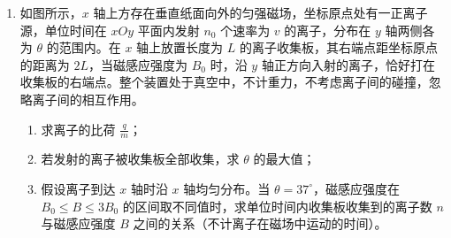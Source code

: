 \documentclass[\gkver]{gaokaozhenti}
\begin{document}
\begin{enumerate}
{\begin{enumerate}
	\item
	$2.3\times10^{-3}\UJ$

\end{enumerate}
}

\item
如图所示，$x$ 轴上方存在垂直纸面向外的匀强磁场，坐标原点处有一正离子源，单位时间在 $xOy$ 平面内发射 $n_0$ 个速率为 $v$ 的离子，分布在 $y$ 轴两侧各为 $\theta$ 的范围内。在 $x$ 轴上放置长度为 $L$ 的离子收集板，其右端点距坐标原点的距离为 $2L$，当磁感应强度为 $B_0$ 时，沿 $y$ 轴正方向入射的离子，恰好打在收集板的右端点。整个装置处于真空中，不计重力，不考虑离子间的碰撞，忽略离子间的相互作用。
\begin{enumerate}
	\item
	求离子的比荷 $\frac{q}{m}$；
	\item
	若发射的离子被收集板全部收集，求 $\theta$ 的最大值；
	\item
	假设离子到达 $x$ 轴时沿 $x$ 轴均匀分布。当 $\theta=37^\circ$，磁感应强度在 $B_0\leq B\leq3B_0$ 的区间取不同值时，求单位时间内收集板收集到的离子数 $n$ 与磁感应强度 $B$ 之间的关系（不计离子在磁场中运动的时间）。
\end{enumerate}


\end{enumerate}
\end{document}
